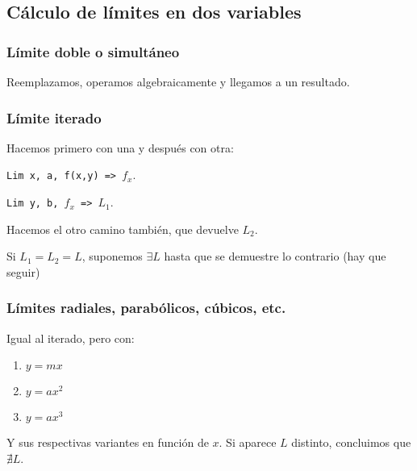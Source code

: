 \subsection{Cálculo de límites en dos variables}

\subsubsection{Límite doble o simultáneo}

Reemplazamos, operamos algebraicamente y llegamos a un resultado.

\subsubsection{Límite iterado}

Hacemos primero con una y después con otra:

\texttt{Lim x, a, f(x,y) => \(f_x\)}.

\texttt{Lim y, b, \(f_x\) => \(L_1\)}.

Hacemos el otro camino también,
que devuelve \(L_2\).

Si \(L_1 = L_2 = L\), suponemos \(\exists L\) hasta que se demuestre lo contrario (hay que seguir)

\subsubsection{Límites radiales, parabólicos, cúbicos, etc.}

Igual al iterado, pero con:

\begin{enumerate}
    \item \(y = mx\)
    \item \(y = ax^{2}\)
    \item \(y = ax^{3}\)
\end{enumerate}

Y sus respectivas variantes en función de \(x\).
Si aparece \(L\) distinto, concluimos que \(\nexists L\).


